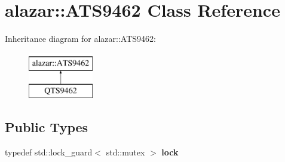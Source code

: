 \hypertarget{classalazar_1_1_a_t_s9462}{}\section{alazar\+:\+:A\+T\+S9462 Class Reference}
\label{classalazar_1_1_a_t_s9462}
Inheritance diagram for alazar\+:\+:A\+T\+S9462\+:\begin{figure}[H]
\begin{center}
\leavevmode
\includegraphics[height=2.000000cm]{classalazar_1_1_a_t_s9462}
\end{center}
\end{figure}
\subsection*{Public Types}
\begin{DoxyCompactItemize}
\item 
typedef std\+::lock\+\_\+guard$<$ std\+::mutex $>$ {\bfseries lock}\hypertarget{classalazar_1_1_a_t_s9462_a735d1f33b2ef63beda54f2d8bde5fd65}{}\label{classalazar_1_1_a_t_s9462_a735d1f33b2ef63beda54f2d8bde5fd65}

\end{DoxyCompactItemize}
